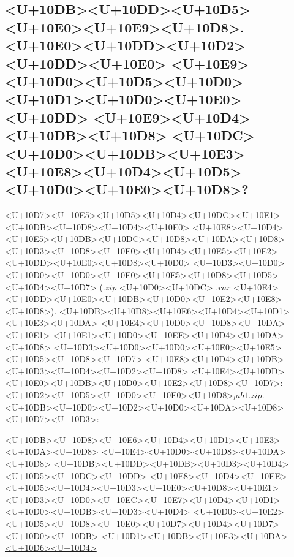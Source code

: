 \documentclass{article}
\begin{document}
\subsection*{<U+10DB><U+10DD><U+10D5><U+10E0><U+10E9><U+10D8>. <U+10E0><U+10DD><U+10D2><U+10DD><U+10E0> <U+10E9><U+10D0><U+10D5><U+10D0><U+10D1><U+10D0><U+10E0><U+10DD> <U+10E9><U+10D4><U+10DB><U+10D8> <U+10DC><U+10D0><U+10DB><U+10E3><U+10E8><U+10D4><U+10D5><U+10D0><U+10E0><U+10D8>?}

<U+10D7><U+10E5><U+10D5><U+10D4><U+10DC><U+10E1> <U+10DB><U+10D8><U+10D4><U+10E0> <U+10E8><U+10D4><U+10E5><U+10DB><U+10DC><U+10D8><U+10DA><U+10D8> <U+10D3><U+10D8><U+10E0><U+10D4><U+10E5><U+10E2><U+10DD><U+10E0><U+10D8><U+10D0> <U+10D3><U+10D0><U+10D0><U+10D0><U+10E0><U+10E5><U+10D8><U+10D5><U+10D4><U+10D7> ($.zip$ <U+10D0><U+10DC> $.rar$ <U+10E4><U+10DD><U+10E0><U+10DB><U+10D0><U+10E2><U+10E8><U+10D8>). <U+10DB><U+10D8><U+10E6><U+10D4><U+10D1><U+10E3><U+10DA> <U+10E4><U+10D0><U+10D8><U+10DA><U+10E1> <U+10E1><U+10D0><U+10EE><U+10D4><U+10DA><U+10D8> <U+10D3><U+10D0><U+10D0><U+10E0><U+10E5><U+10D5><U+10D8><U+10D7> <U+10E8><U+10D4><U+10DB><U+10D3><U+10D4><U+10D2><U+10D8> <U+10E4><U+10DD><U+10E0><U+10DB><U+10D0><U+10E2><U+10D8><U+10D7>: <U+10D2><U+10D5><U+10D0><U+10E0><U+10D8>$_lab1.zip$. <U+10DB><U+10D0><U+10D2><U+10D0><U+10DA><U+10D8><U+10D7><U+10D3>:


<U+10DB><U+10D8><U+10E6><U+10D4><U+10D1><U+10E3><U+10DA><U+10D8> <U+10E4><U+10D0><U+10D8><U+10DA><U+10D8> <U+10DB><U+10DD><U+10DB><U+10D3><U+10D4><U+10D5><U+10DC><U+10DD> <U+10E8><U+10D4><U+10EE><U+10D5><U+10D4><U+10D3><U+10E0><U+10D8><U+10E1> <U+10D3><U+10D0><U+10EC><U+10E7><U+10D4><U+10D1><U+10D0><U+10DB><U+10D3><U+10D4> <U+10D0><U+10E2><U+10D5><U+10D8><U+10E0><U+10D7><U+10D4><U+10D7> <U+10D0><U+10DB> \href{https://www.dropbox.com/request/SOiURfx1T4q7dt13IbfK}{<U+10D1><U+10DB><U+10E3><U+10DA><U+10D6><U+10D4>}
\end{document}
